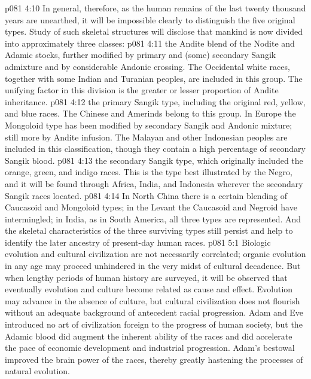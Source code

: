 \vs p081 4:10 In general, therefore, as the human remains of the last twenty thousand years are unearthed, it will be impossible clearly to distinguish the five original types. Study of such skeletal structures will disclose that mankind is now divided into approximately three classes:
\vs p081 4:11 \bibnobreakspace {} the Andite blend of the Nodite and Adamic stocks, further modified by primary and (some) secondary Sangik admixture and by considerable Andonic crossing. The Occidental white races, together with some Indian and Turanian peoples, are included in this group. The unifying factor in this division is the greater or lesser proportion of Andite inheritance.
\vs p081 4:12 \pc {}\bibnobreakspace {} the primary Sangik type, including the original red, yellow, and blue races. The Chinese and Amerinds belong to this group. In Europe the Mongoloid type has been modified by secondary Sangik and Andonic mixture; still more by Andite infusion. The Malayan and other Indonesian peoples are included in this classification, though they contain a high percentage of secondary Sangik blood.
\vs p081 4:13 \pc {}\bibnobreakspace {} the secondary Sangik type, which originally included the orange, green, and indigo races. This is the type best illustrated by the Negro, and it will be found through Africa, India, and Indonesia wherever the secondary Sangik races located.
\vs p081 4:14 \pc In North China there is a certain blending of Caucasoid and Mongoloid types; in the Levant the Caucasoid and Negroid have intermingled; in India, as in South America, all three types are represented. And the skeletal characteristics of the three surviving types still persist and help to identify the later ancestry of present\hyp{}day human races.
\vs p081 5:1 Biologic evolution and cultural civilization are not necessarily correlated; organic evolution in any age may proceed unhindered in the very midst of cultural decadence. But when lengthy periods of human history are surveyed, it will be observed that eventually evolution and culture become related as cause and effect. Evolution may advance in the absence of culture, but cultural civilization does not flourish without an adequate background of antecedent racial progression. Adam and Eve introduced no art of civilization foreign to the progress of human society, but the Adamic blood did augment the inherent ability of the races and did accelerate the pace of economic development and industrial progression. Adam’s bestowal improved the brain power of the races, thereby greatly hastening the processes of natural evolution.
